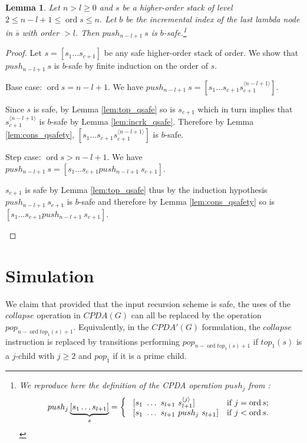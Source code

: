 \documentclass{article}
\newcommand{\ord}{\mathop{\mathrm{ord}}}
\newtheorem{lemma}{Lemma}[section]
\theoremstyle{remark}
\theoremstyle{definition}
\newcommand\orddec\overline
\begin{document}
\begin{lemma}
\label{lem:pushj_safe_implies_b-safe} Let $n>l\geq 0$ and $s$ be a higher-order stack
of level $2 \leq n-l+1 \leq \ord{s} \leq n$. Let $b$ be the incremental index of the last lambda node in $\orddec{s}$ with order $>l$. Then $push_{n-l+1}\ s$ is $b$-safe.\footnote{We reproduce here the definition of the
CPDA operation $push_j$ from \cite{hague-sto07}:
$$ push_j \underbrace{[ s_1 \ldots s_{l+1} ]}_{s} =
\left\{
  \begin{array}{ll}
\    [s_1\ \ldots\ s_{l+1}\ s_{l+1}^{\langle j \rangle}]  &\hbox{if $j = \ord{s}$;}\\
\    [s_1\ \ldots\ s_{l+1}\ push_j\ s_{l+1}]  &\hbox{if $j<\ord{s}$.}
 \end{array}
\right.
$$}
\end{lemma}
\begin{proof}
Let $s=[s_1 \ldots s_{c+1}]$ be any safe higher-order stack of order. We show that $push_{n-l+1}~s$ is $b$-safe by finite induction on the order of $s$.
    \begin{compactitem}
      \item Base case: $\ord{s} = n-l+1 $. We have
    $push_{n-l+1}~s = [ s_1 \ldots s_{c+1} s_{c+1}^{\langle n-l+1
    \rangle}]$.

    Since $s$ is safe, by Lemma \ref{lem:top_qsafe} so is $s_{c+1}$
    which in turn implies that $s_{c+1}^{\langle n-l+1\rangle}$ is
    $b$-safe by Lemma \ref{lem:incrk_qsafe}. Therefore by Lemma
    \ref{lem:cons_qsafety},  $[ s_1 \ldots s_{c+1} s_{c+1}^{\langle n-l+1
    \rangle}]$ is $b$-safe.

      \item Step case: $\ord{s} > n-l+1$. We have
    $push_{n-l+1}~s = [ s_1 \ldots s_{c+1} push_{n-l+1}~s_{c+1}]$.

    $s_{c+1}$ is safe by Lemma \ref{lem:top_qsafe} thus by the
    induction hypothesis $push_{n-l+1}~s_{c+1}$ is $b$-safe and therefore by Lemma \ref{lem:cons_qsafety} so
    is $[ s_1 \ldots s_{c+1} push_{n-l+1}~s_{c+1}]$.
    \end{compactitem}
\end{proof}





\section{Simulation}

We claim that provided that the input recursion scheme is safe, the
uses of the $collapse$ operation in $CPDA(G)$ can all be replaced by the operation $pop_{n-\ord{top_1(s)}+1}$. Equivalently, in the $CPDA'(G)$ formulation, the
$collapse$ instruction is replaced by transitions performing $pop_{n-\ord{top_1(s)}+1}$ if $top_1(s)$ is a $j$-child with $j\geq 2$ and $pop_1$ if it is a prime
child.
\end{document}
